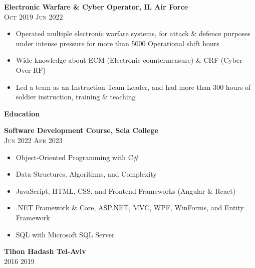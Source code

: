 \documentclass[oneside]{article}
\begin{document}
{\begin{minipage}[t][\dimexpr\textheight-2\fboxrule-2\fboxsep\relax][t]{\dimexpr0.55\textwidth-2\fboxrule-2\fboxsep\relax}
\begin{itemize}
        \end{itemize}
            
        \vspace{1\baselineskip} 

        \textbf{\large Electronic Warfare \& Cyber Operator, IL Air Force} \\
        {\scshape{}\selectfont\footnotesize Oct 2019 \textendash{} Jun 2022} 
        \setlength{\itemsep}{-3pt}
        \begin{itemize}
            \item Operated multiple electronic warfare systems, for attack \& defence purposes under intense pressure for more than 5000 Operational shift hours
            \item Wide knowledge about ECM (Electronic countermeasure) \& CRF (Cyber Over RF)
            \item Led a team as an Instruction Team Leader, and had more than 300 hours of soldier instruction, training \& teaching
        \end{itemize}

        \vspace{2\baselineskip} 
        {\LARGE \textbf{Education}} \\
        \vspace{1\baselineskip} 

        \textbf{\large Software Development Course, Sela College} \\
        {\scshape{}\selectfont\footnotesize Jun 2022 \textendash{} Apr 2023} 
        
        \begin{itemize}
            \item Object-Oriented Programming with C\#
            \item Data Structures, Algorithms, and Complexity
            \item JavaScript, HTML, CSS, and Frontend Frameworks (Angular & React)
            \item .NET Framework & Core, ASP.NET, MVC, WPF, WinForms, and Entity Framework
            \item SQL with Microsoft SQL Server
        \end{itemize}
            
        \vspace{1\baselineskip} 

        \textbf{\large Tihon Hadash Tel-Aviv} \\
        {\scshape{}\selectfont\footnotesize 2016 \textendash{} 2019} 
        
    \end{minipage}
}%
\end{document}
